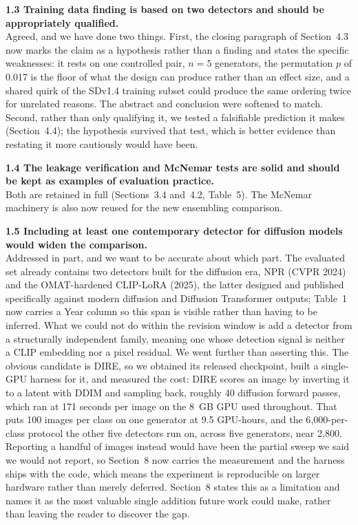 \documentclass[11pt]{article}
\begin{document}
\noindent\textbf{1.3 Training data finding is based on two detectors and
should be appropriately qualified.}\\[1pt]
Agreed, and we have done two things. First, the closing paragraph of
Section~4.3 now marks the claim as a hypothesis rather
than a finding and states the specific weaknesses: it rests on one
controlled pair, $n=5$ generators, the permutation $p$ of 0.017 is the
floor of what the design can produce rather than an effect size, and a
shared quirk of the SDv1.4 training subset could produce the same ordering
twice for unrelated reasons. The abstract and conclusion were softened to
match. Second, rather than only qualifying it, we tested a falsifiable
prediction it makes (Section~4.4); the hypothesis survived
that test, which is better evidence than restating it more cautiously
would have been.

\noindent\textbf{1.4 The leakage verification and McNemar tests are solid
and should be kept as examples of evaluation practice.}\\[1pt]
Both are retained in full (Sections~3.4
and~4.2, Table~5). The McNemar
machinery is also now reused for the new ensembling comparison.

\noindent\textbf{1.5 Including at least one contemporary detector for
diffusion models would widen the comparison.}\\[1pt]
Addressed in part, and we want to be accurate about which part. The
evaluated set already contains two detectors built for the diffusion era,
NPR (CVPR 2024) and the OMAT-hardened CLIP-LoRA (2025), the latter
designed and published specifically against modern diffusion and Diffusion
Transformer outputs; Table~1 now carries a Year column
so this span is visible rather than having to be inferred. What we could
not do within the revision window is add a detector from a structurally
independent family, meaning one whose detection signal is neither a CLIP
embedding nor a pixel residual. We went further than asserting this. The
obvious candidate is DIRE, so we obtained its released checkpoint, built a
single-GPU harness for it, and measured the cost: DIRE scores an image by
inverting it to a latent with DDIM and sampling back, roughly 40 diffusion
forward passes, which ran at 171 seconds per image on the 8~GB GPU used
throughout. That puts 100 images per class on one generator at 9.5
GPU-hours, and the 6{,}000-per-class protocol the other five detectors run
on, across five generators, near 2{,}800. Reporting a handful of images
instead would have been the partial sweep we said we would not report, so
Section~8 now carries the measurement and the harness ships with the code,
which means the experiment is reproducible on larger hardware rather than
merely deferred.
Section~8 states this as a limitation and names it as
the most valuable single addition future work could make, rather than
leaving the reader to discover the gap.
\end{document}
